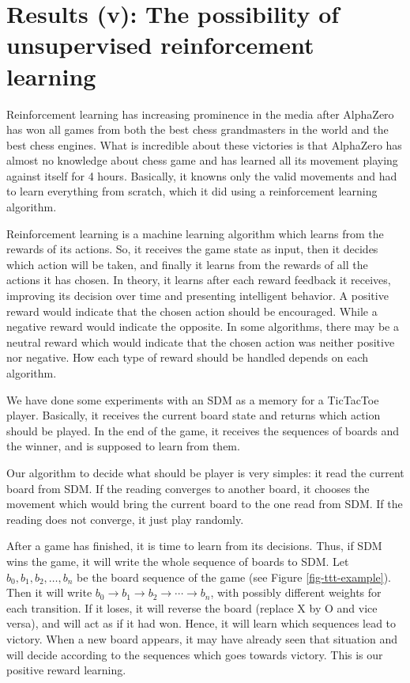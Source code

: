 \section{Results (v): The possibility of unsupervised reinforcement learning}

Reinforcement learning has increasing prominence in the media after AlphaZero has won all games from both the best chess grandmasters in the world and the best chess engines. What is incredible about these victories is that AlphaZero has almost no knowledge about chess game and has learned all its movement playing against itself for 4 hours. Basically, it knowns only the valid movements and had to learn everything from scratch, which it did using a reinforcement learning algorithm.

Reinforcement learning is a machine learning algorithm which learns from the rewards of its actions. So, it receives the game state as input, then it decides which action will be taken, and finally it learns from the rewards of all the actions it has chosen. In theory, it learns after each reward feedback it receives, improving its decision over time and presenting intelligent behavior. A positive reward would indicate that the chosen action should be encouraged. While a negative reward would indicate the opposite. In some algorithms, there may be a neutral reward which would indicate that the chosen action was neither positive nor negative. How each type of reward should be handled depends on each algorithm.

We have done some experiments with an SDM as a memory for a TicTacToe player. Basically, it receives the current board state and returns which action should be played. In the end of the game, it receives the sequences of boards and the winner, and is supposed to learn from them.

Our algorithm to decide what should be player is very simples: it read the current board from SDM. If the reading converges to another board, it chooses the movement which would bring the current board to the one read from SDM. If the reading does not converge, it just play randomly.

After a game has finished, it is time to learn from its decisions. Thus, if SDM wins the game, it will write the whole sequence of boards to SDM. Let $b_0, b_1, b_2, \dots, b_n$ be the board sequence of the game (see Figure \ref{fig-ttt-example}). Then it will write $b_0 \rightarrow b_1 \rightarrow b_2 \rightarrow \cdots \rightarrow b_n$, with possibly different weights for each transition. If it loses, it will reverse the board (replace X by O and vice versa), and will act as if it had won. Hence, it will learn which sequences lead to victory. When a new board appears, it may have already seen that situation and will decide according to the sequences which goes towards victory. This is our positive reward learning.

